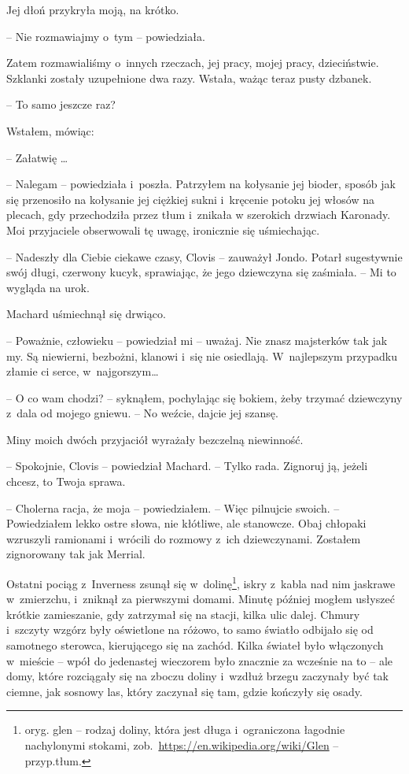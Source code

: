 \documentclass[oneside,polish,11pt,sfheadings]{mwbk}
\begin{document}
Jej dłoń przykryła moją, na krótko.

-- Nie rozmawiajmy o~tym -- powiedziała.

Zatem rozmawialiśmy o~innych rzeczach, jej pracy, mojej pracy,
dzieciństwie. Szklanki zostały uzupełnione dwa razy. Wstała, ważąc teraz
pusty dzbanek. 

-- To samo jeszcze raz?

Wstałem, mówiąc: 

-- Załatwię \ldots

-- Nalegam -- powiedziała i~poszła. Patrzyłem na kołysanie jej bioder,
sposób jak się przenosiło na kołysanie jej ciężkiej sukni i~kręcenie potoku jej włosów na plecach, gdy przechodziła przez tłum i~znikała
w szerokich drzwiach Karonady. Moi przyjaciele obserwowali tę uwagę,
ironicznie się uśmiechając.

-- Nadeszły dla Ciebie ciekawe czasy, Clovis -- zauważył Jondo. Potarł
sugestywnie swój długi, czerwony kucyk, sprawiając, że jego dziewczyna
się zaśmiała. -- Mi to wygląda na urok.

Machard uśmiechnął się drwiąco. 

-- Poważnie, człowieku -- powiedział mi -- uważaj. Nie znasz majsterków tak jak my. Są niewierni, bezbożni, klanowi i~się nie osiedlają. W~najlepszym przypadku złamie ci serce, w~najgorszym\ldots

-- O co wam chodzi? -- syknąłem, pochylając się bokiem, żeby trzymać
dziewczyny z~dala od mojego gniewu. -- No weźcie, dajcie jej szansę.

Miny moich dwóch przyjaciół wyrażały bezczelną niewinność.

-- Spokojnie, Clovis -- powiedział Machard. -- Tylko rada. Zignoruj ją,
jeżeli chcesz, to Twoja sprawa.

-- Cholerna racja, że moja -- powiedziałem. -- Więc pilnujcie swoich. -- Powiedziałem lekko ostre słowa, nie kłótliwe, ale stanowcze. Obaj
chłopaki wzruszyli ramionami i~wrócili do rozmowy z~ich dziewczynami.
Zostałem zignorowany tak jak Merrial.

Ostatni pociąg z~Inverness zsunął się w~dolinę\footnote{ oryg. glen -- rodzaj
doliny, która jest długa i~ograniczona łagodnie nachylonymi stokami,
zob.~\url{https://en.wikipedia.org/wiki/Glen} -- przyp.tłum.},
iskry z~kabla nad nim jaskrawe w~zmierzchu, i~zniknął za pierwszymi
domami. Minutę później mogłem usłyszeć krótkie zamieszanie, gdy
zatrzymał się na stacji, kilka ulic dalej. Chmury i~szczyty wzgórz były
oświetlone na różowo, to samo światło odbijało się od samotnego
sterowca, kierującego się na zachód. Kilka świateł było włączonych w~mieście -- wpół do jedenastej wieczorem było znacznie za wcześnie na to -- ale domy, które rozciągały się na zboczu doliny i~wzdłuż brzegu
zaczynały być tak ciemne, jak sosnowy las, który zaczynał się tam, gdzie
kończyły się osady.
\end{document}
